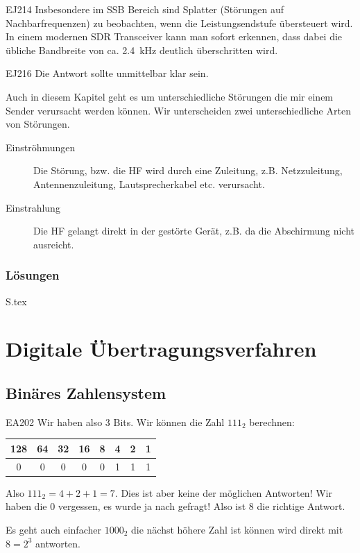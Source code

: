 \documentclass[10pt,a4paper,ngerman]{article}
\theoremstyle{definition}
\theoremstyle{plain}
\theoremstyle{mytheorem}
\theoremstyle{definition}
\newenvironment{ohmchapter}{}
{
  \subsubsection*{Lösungen}
  S\arabic{subsection}.tex}
}
\begin{document}
\begin{sol}{EJ214}
Insbesondere im SSB Bereich sind Splatter (Störungen auf Nachbarfrequenzen) zu beobachten, wenn die Leistungsendstufe übersteuert wird. In einem modernen SDR Transceiver kann man sofort erkennen, dass dabei die 
übliche Bandbreite von ca. \SI{2.4} {\kilo\hertz }  deutlich überschritten wird.
\end{sol}

\begin{sol}{EJ216}
  Die Antwort sollte unmittelbar klar sein.
\end{sol}


\begin{ohmchapter}
Auch in diesem Kapitel geht es um unterschiedliche Störungen die mir einem Sender verursacht werden können.
Wir unterscheiden zwei unterschiedliche Arten von Störungen.

\begin{description}
  \item[Einströhmungen] Die Störung, bzw. die HF wird durch eine Zuleitung, z.B. Netzzuleitung, Antennenzuleitung, Lautsprecherkabel etc. verursacht. 
  \item[Einstrahlung] Die HF gelangt direkt in der gestörte Gerät, z.B. da die Abschirmung nicht ausreicht.
\end{description}

\end{ohmchapter}

\section{Digitale Übertragungsverfahren}
\subsection{Binäres Zahlensystem} \label{sec:binär}



\begin{sol}{EA202}
  Wir haben also 3 Bits. Wir können die Zahl $111_2$ berechnen:
    \begin{center}
  \begin{tabular}{|c|c|c|c|c|c|c|c|} 
    128& 64&32&16 &8 & 4 & 2 & 1 \\ \hline
    0&0&0&0&0&1&1&1
  \end{tabular} 
  \end{center}
Also $111_2 = 4+2+1 = 7$. Dies ist aber keine der möglichen Antworten! Wir haben die 0 vergessen, es wurde ja nach  gefragt! Also ist 8 die richtige Antwort.

Es geht auch einfacher $1000_2$ die nächst höhere Zahl ist können wird direkt mit $8 = 2^3$ antworten.
\end{sol}
\end{document}
